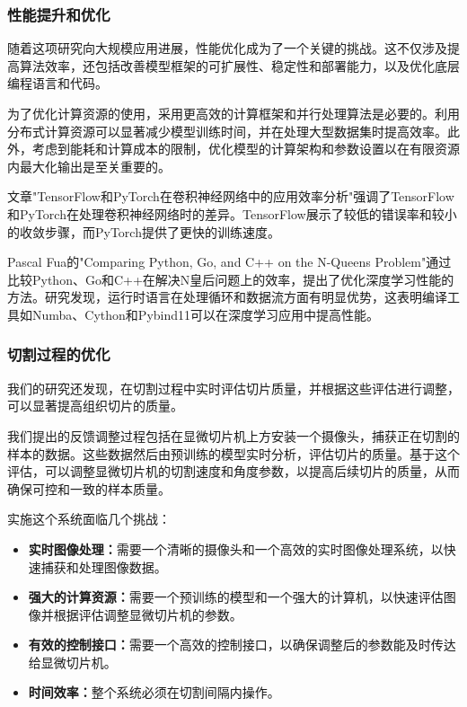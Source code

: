 \subsubsection{性能提升和优化}

随着这项研究向大规模应用进展，性能优化成为了一个关键的挑战。这不仅涉及提高算法效率，还包括改善模型框架的可扩展性、稳定性和部署能力，以及优化底层编程语言和代码。

为了优化计算资源的使用，采用更高效的计算框架和并行处理算法是必要的。利用分布式计算资源可以显著减少模型训练时间，并在处理大型数据集时提高效率。此外，考虑到能耗和计算成本的限制，优化模型的计算架构和参数设置以在有限资源内最大化输出是至关重要的。

文章"TensorFlow和PyTorch在卷积神经网络中的应用效率分析"强调了TensorFlow和PyTorch在处理卷积神经网络时的差异\cite{6.2}。TensorFlow展示了较低的错误率和较小的收敛步骤，而PyTorch提供了更快的训练速度。

Pascal Fua的"Comparing Python, Go, and C++ on the N-Queens Problem"通过比较Python、Go和C++在解决N皇后问题上的效率，提出了优化深度学习性能的方法。\cite{6.3}研究发现，运行时语言在处理循环和数据流方面有明显优势，这表明编译工具如Numba、Cython和Pybind11可以在深度学习应用中提高性能。

\subsubsection{切割过程的优化}

我们的研究还发现，在切割过程中实时评估切片质量，并根据这些评估进行调整，可以显著提高组织切片的质量。

我们提出的反馈调整过程包括在显微切片机上方安装一个摄像头，捕获正在切割的样本的数据。这些数据然后由预训练的模型实时分析，评估切片的质量。基于这个评估，可以调整显微切片机的切割速度和角度参数，以提高后续切片的质量，从而确保可控和一致的样本质量。

实施这个系统面临几个挑战：

\begin{itemize} \item \textbf{实时图像处理：}需要一个清晰的摄像头和一个高效的实时图像处理系统，以快速捕获和处理图像数据。 \item \textbf{强大的计算资源：}需要一个预训练的模型和一个强大的计算机，以快速评估图像并根据评估调整显微切片机的参数。 \item \textbf{有效的控制接口：}需要一个高效的控制接口，以确保调整后的参数能及时传达给显微切片机。 \item \textbf{时间效率：}整个系统必须在切割间隔内操作。 \end{itemize}

